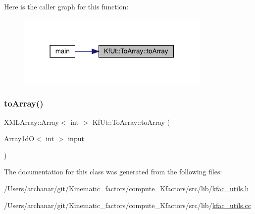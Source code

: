 Here is the caller graph for this function\+:\nopagebreak
\begin{figure}[H]
\begin{center}
\leavevmode
\includegraphics[width=267pt]{d3/dec/classKfUt_1_1ToArray_ac97892c7b8ae265fe9d91d3f823b3f98_icgraph}
\end{center}
\end{figure}
\mbox{\label{classKfUt_1_1ToArray_a272ebce4969f38835c7a503a85a4f8d3}} 
\subsubsection{\texorpdfstring{toArray()}{toArray()}\hspace{0.1cm}{\footnotesize\ttfamily [2/2]}}
{\footnotesize\ttfamily X\+M\+L\+Array\+::\+Array$<$ int $>$ Kf\+Ut\+::\+To\+Array\+::to\+Array (\begin{DoxyParamCaption}\item[{Array1dO$<$ int $>$}]{input }\end{DoxyParamCaption})\hspace{0.3cm}{\ttfamily [static]}}



The documentation for this class was generated from the following files\+:\begin{DoxyCompactItemize}
\item 
/\+Users/archanar/git/\+Kinematic\+\_\+factors/compute\+\_\+\+Kfactors/src/lib/\mbox{\hyperlink{kfac__utils_8h}{kfac\+\_\+utils.\+h}}\item 
/\+Users/archanar/git/\+Kinematic\+\_\+factors/compute\+\_\+\+Kfactors/src/lib/\mbox{\hyperlink{kfac__utils_8cc}{kfac\+\_\+utils.\+cc}}\end{DoxyCompactItemize}
